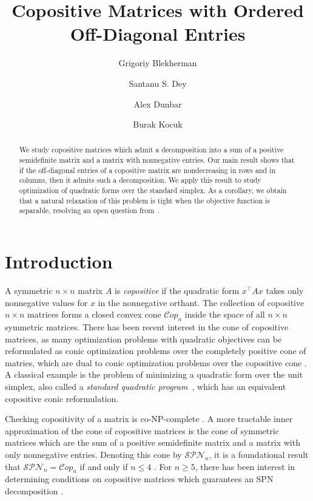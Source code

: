 \documentclass{amsart}
\title{Copositive Matrices with Ordered Off-Diagonal Entries}
\author{Grigoriy Blekherman}\address{Grigoriy Blekherman, School of Mathematics, Georgia Institute of Technology}\email{greg@math.gatech.edu}
\author{Santanu S. Dey}\address{Santanu S. Dey, H. Milton Stewart School of Industrial and Systems Engineering, Georgia Institute of Technology}\email{santanu.dey@isye.gatech.edu}
\author{Alex Dunbar}\address{Alex Dunbar, School of Mathematics, Georgia Institute of Technology}\email{adunbar30@gatech.edu}
\author{Burak Kocuk}\address{Burak Kocuk, Industrial Engineering Program, Sabancı University}\email{burakkocuk@sabanciuniv.edu}
\newcommand{\Cop}{\mathcal{C}op}
\newcommand{\SPN}{\mathcal{SPN}}
\theoremstyle{definition}
\begin{document}
\begin{abstract}
    We study copositive matrices which admit a decomposition into a sum of a positive semidefinite matrix and a matrix with nonnegative entries. Our main result shows that if the off-diagonal entries of a copositive matrix are nondecreasing in rows and in columns, then it admits such a decomposition. We apply this result to study optimization of quadratic forms over the standard simplex. As a corollary, we obtain that a natural relaxation of this problem is tight when the objective function is separable, resolving an open question from~\cite{dey_convexification_2025-1}.
\end{abstract}

\maketitle

\section{Introduction}

A symmetric $n\times n$ matrix $A$ is \emph{copositive} if the quadratic form $x^\top A x$ takes only nonnegative values for $x$ in the nonnegative orthant. The collection of copositive $n\times n$ matrices forms a closed convex cone $\Cop_n$ inside the space of all $n\times n$ symmetric matrices. There has been recent interest in the cone of copositive matrices, as many optimization problems with quadratic objectives can be reformulated as conic optimization problems over the completely positive cone of matries, which are dual to conic optimization problems over the copositive cone \cite{bomze_copositive_2000,burer2009copositive,cifuentes2025sensitivity}. A classical example is the problem of minimizing a quadratic form over the unit simplex, also called a \emph{standard quadratic program}~\cite{bomze1998standard,bomze_copositive_2000,bomze2002solving,bomze2008new,chen2013sparse,saugol2015analysis,bomze2025tighter}, which  has an equivalent copositive conic reformulation. 

Checking copositivity of a matrix is co-NP-complete \cite{murty_np-complete_1987}. A more tractable inner approximation of the cone of copositive matrices is the cone of symmetric matrices which are the sum of a positive semidefinite matrix and a matrix with only nonnegative entries. Denoting this cone by $\SPN_n$, it is a foundational result that $\SPN_n = \Cop_n$ if and only if $n\leq 4$ \cite{diananda1962non}. For $n \geq 5$, there has been interest in determining conditions on copositive matrices which guarantees an SPN decomposition \cite{shaked-monderer_spn_2016,gokmen2022standard}. 
\end{document}
